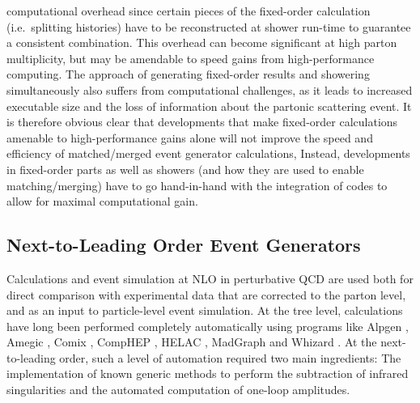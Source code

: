 \documentclass{article}
\begin{document}
computational overhead since certain pieces of the fixed-order calculation 
(i.e.~splitting histories) have to be reconstructed at shower run-time to 
guarantee a consistent combination. This overhead can become significant
at high parton multiplicity, but may be amendable to speed gains from
high-performance computing. The approach of generating fixed-order
results and showering simultaneously also suffers from computational 
challenges, as it leads to increased executable size and the loss of 
information about the partonic scattering event. It is therefore obvious
clear that developments that make fixed-order calculations amenable to 
high-performance gains alone will not improve the speed and efficiency of 
matched/merged event generator calculations, Instead, developments in 
fixed-order parts as well as showers (and how they are used to enable 
matching/merging) have to go hand-in-hand with the integration of codes to
allow for maximal computational gain.

\subsection{Next-to-Leading Order Event Generators}

Calculations and event simulation at NLO in perturbative QCD are used both 
for direct comparison with experimental data that are corrected to the 
parton level, and as an input to particle-level event simulation.
At the tree level, calculations have long been performed completely automatically 
using programs like Alpgen \cite{Mangano:2002ea}, Amegic \cite{Krauss:2001iv}, 
Comix \cite{Gleisberg:2008fv}, CompHEP \cite{Boos:2004kh}, HELAC \cite{Kanaki:2000ey}, 
MadGraph \cite{Alwall:2011uj} and Whizard \cite{Kilian:2007gr}.
At the next-to-leading order, such a level of automation required two main ingredients: 
The implementation of known generic methods to perform the subtraction of infrared 
singularities and the automated computation of one-loop amplitudes. 
\end{document}
